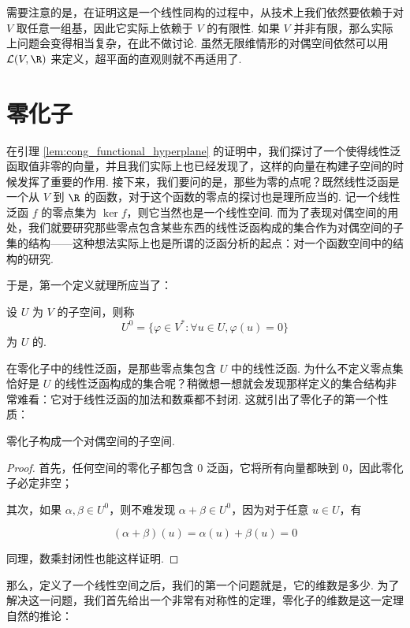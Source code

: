 需要注意的是，在证明这是一个线性同构的过程中，从技术上我们依然要依赖于对 $V$ 取任意一组基，因此它实际上依赖于 $V$ 的有限性. 如果 $V$ 并非有限，那么实际上问题会变得相当复杂，在此不做讨论. 虽然无限维情形的对偶空间依然可以用 $\mathcal{L}(V, \R)$ 来定义，超平面的直观则就不再适用了.

\section{零化子}

在引理 \ref{lem:cong_functional_hyperplane} 的证明中，我们探讨了一个使得线性泛函取值非零的向量，并且我们实际上也已经发现了，这样的向量在构建子空间的时候发挥了重要的作用. 接下来，我们要问的是，那些为零的点呢？既然线性泛函是一个从 $V$ 到 $\R$ 的函数，对于这个函数的零点的探讨也是理所应当的. 记一个线性泛函 $f$ 的零点集为 $\ker f$，则它当然也是一个线性空间. 而为了表现对偶空间的用处，我们就要研究那些零点包含某些东西的线性泛函构成的集合作为对偶空间的子集的结构——这种想法实际上也是所谓的泛函分析的起点：对一个函数空间中的结构的研究.

于是，第一个定义就理所应当了：

\begin{definition}{}{}
    设 $U$ 为 $V$ 的子空间，则称
    \[
        U^0 = \{\varphi \in V^*: \forall u \in U, \varphi(u) = 0\}
    \]
    为 $U$ 的.
\end{definition}

在零化子中的线性泛函，是那些零点集包含 $U$ 中的线性泛函. 为什么不定义零点集恰好是 $U$ 的线性泛函构成的集合呢？稍微想一想就会发现那样定义的集合结构非常难看：它对于线性泛函的加法和数乘都不封闭. 这就引出了零化子的第一个性质：

\begin{theorem}{}{}
    零化子构成一个对偶空间的子空间.
\end{theorem}

\begin{proof}
    首先，任何空间的零化子都包含 $0$ 泛函，它将所有向量都映到 $0$，因此零化子必定非空；

    其次，如果 $\alpha, \beta \in U^0$，则不难发现 $\alpha + \beta \in U^0$，因为对于任意 $u \in U$，有

    \[
        (\alpha + \beta) (u) = \alpha (u) + \beta (u) = 0
    \]

    同理，数乘封闭性也能这样证明.
\end{proof}

那么，定义了一个线性空间之后，我们的第一个问题就是，它的维数是多少. 为了解决这一问题，我们首先给出一个非常有对称性的定理，零化子的维数是这一定理自然的推论：

